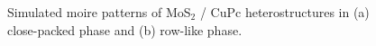 \documentclass[12pt]{article}
\begin{document}
\begin{figure}[H]
\centering
{}\hspace{0pt}
\caption{Simulated moire patterns of MoS$_2$ / CuPc heterostructures in (a) close-packed phase and (b) row-like phase.}\label{fig:CuPc Moire}
\end{figure}
\end{document}
